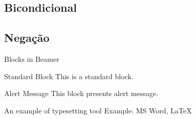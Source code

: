 \documentclass[10pt]{beamer}
\begin{document}
\subsection{Bicondicional}
%
\subsection{Negação}

\begin{frame}{Blocks in Beamer}
    \begin{block}{Standard Block}
        This is a standard block.
    \end{block}
    \begin{alertblock}{Alert Message}
        This block presents alert message.
    \end{alertblock}
    \begin{exampleblock}{An example of typesetting tool}
        Example: MS Word, \LaTeX{}
    \end{exampleblock}
\end{frame} 
\end{document}
